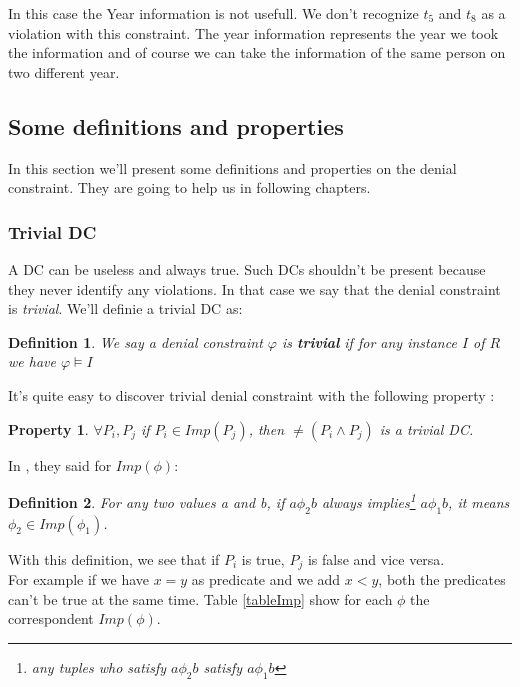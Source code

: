 \documentclass[letterpaper, 12pt]{report}
\newtheorem{mydef}{Definition}
\newtheorem{myprop}{Property}
\begin{document}
In this case the Year information is not usefull. We don't recognize $t_5$ and $t_8$ as a violation with this constraint. The year information represents the year we took the information and of course we can take the information of the same person on two different year.

\subsection{Some definitions and properties}

In this section we'll present some definitions and properties on the denial constraint. They are going to help us in following chapters.

\subsubsection{Trivial DC}

A DC can be useless and always true. Such DCs shouldn't be present because they never identify any violations. In that case we say that the denial constraint is \emph{trivial}. We'll definie a trivial DC as:

\begin{mydef}
	We say a denial constraint $\varphi$ is \textbf{trivial} if for any instance $I$  of $R$ we have $\varphi \models I$
\end{mydef}

It's quite easy to discover trivial denial constraint with the following property \cite{DCs}:

\begin{myprop}
\label{trivialprop}
 $\forall P_i, P_j$ if $P_i \in Imp(P_j)$, then $\neq(P_i \wedge P_j)$ is a trivial DC.
\end{myprop}

In \cite{main}, they said for $Imp(\phi)$:

\begin{mydef} For any two values a and b, if $a \phi_2 b$ always implies\footnote{any tuples who satisfy $a\phi_2 b$ satisfy $a\phi_1 b$} $a \phi_1 b$, it means $\phi_2 \in Imp(\phi_1)$.
\end{mydef}

With this definition, we see that if $P_i$ is true, $P_j$ is false and vice versa.\\

For example if we have $x = y$ as predicate and we add $x < y$, both the predicates can't be true at the same time. Table \ref{tableImp} show for each $\phi$ the correspondent $Imp(\phi)$.
\end{document}
